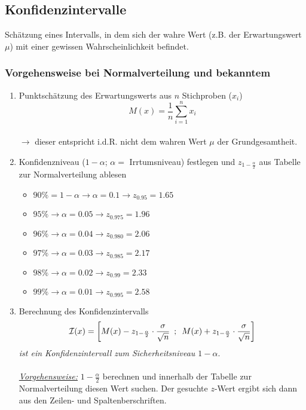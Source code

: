 \subsection{Konfidenzintervalle}

Schätzung eines Intervalls, in dem sich der wahre Wert (z.B. der Erwartungswert~\(\mu\)) mit einer gewissen Wahrscheinlichkeit befindet.

\subsubsection{Vorgehensweise bei Normalverteilung und \textbf{bekanntem} \boldmath{\(\sigma\)}}

\begin{enumerate}
    \item Punktschätzung des Erwartungswerts aus \(n\) Stichproben (\(x_i\))
            \[M(x)=\frac{1}{n}\sum_{i=1}^{n}x_i\]\\
            \(\rightarrow\) dieser entspricht i.d.R. nicht dem wahren Wert \(\mu\) der Grundgesamtheit.

    \item Konfidenzniveau (\(1-\alpha\); \(\alpha=\) Irrtumsniveau) festlegen und \(z_{1-\frac{\alpha}{2}}\) aus Tabelle zur Normalverteilung ablesen
        \begin{itemize}
            \item \(90\% = 1-\alpha \rightarrow \alpha=0.1\rightarrow z_{0.95}=1.65\)
            \item \(95\% \rightarrow \alpha=0.05\rightarrow z_{0.975}=1.96\)
            \item \(96\% \rightarrow \alpha=0.04\rightarrow z_{0.980}=2.06\)
            \item \(97\% \rightarrow \alpha=0.03\rightarrow z_{0.985}=2.17\)
            \item \(98\% \rightarrow \alpha=0.02\rightarrow z_{0.99}=2.33\)
            \item \(99\% \rightarrow \alpha=0.01\rightarrow z_{0.995}=2.58\)
        \end{itemize}
    \item Berechnung des Konfidenzintervalls
        \begin{equation*}
            \mathcal{I}(x) = \left[M(x) - z_{1-\frac{\alpha}{2}} \cdot \frac{\sigma}{\sqrt{n}}\hspace{0.5em}; \hspace{0.5em}M(x) + z_{1-\frac{\alpha}{2}} \cdot \frac{\sigma}{\sqrt{n}}\right]
        \end{equation*}
        \emph{ist ein Konfidenzintervall zum Sicherheitsniveau \(1-\alpha\)}.\\\\
        \underline{\emph{Vorgehensweise:}} \(1-\frac{\alpha}{2}\) berechnen und innerhalb der Tabelle zur Normalverteilung diesen Wert suchen. Der gesuchte \(z\)-Wert ergibt sich dann aus den Zeilen- und Spaltenberschriften.\\
\end{enumerate}

